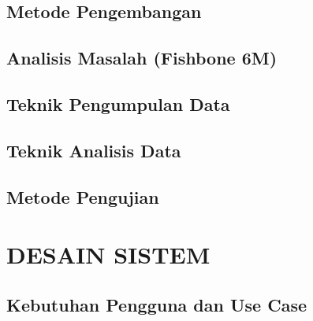 \documentclass[12pt,a4paper,oneside,openany]{report}
\begin{document}
\subsection{Metode Pengembangan}
\label{subsec:metode-pengembangan}

\subsection{Analisis Masalah (Fishbone 6M)}
\label{subsec:analisis-masalah}

\subsection{Teknik Pengumpulan Data}
\label{subsec:teknik-pengumpulan-data}

\subsection{Teknik Analisis Data}
\label{subsec:teknik-analisis-data}

\subsection{Metode Pengujian}
\label{subsec:metode-pengujian}

\section{DESAIN SISTEM}
\label{sec:desain-sistem}

\subsection{Kebutuhan Pengguna dan Use Case}
\label{subsec:kebutuhan-pengguna}
\end{document}
